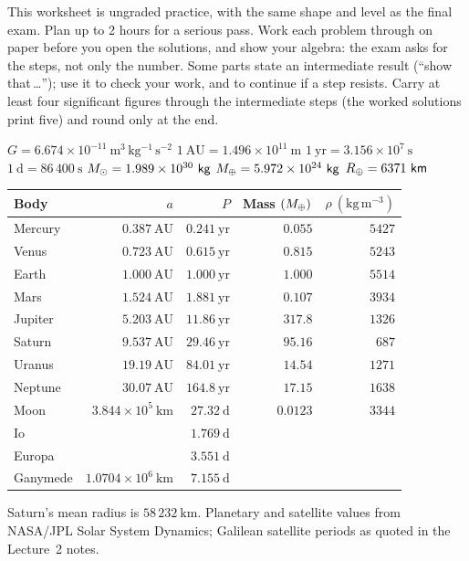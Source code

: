 
\ipsmaketitle

This worksheet is ungraded practice, with the same shape and level as the final exam.
Plan up to 2 hours for a serious pass.
Work each problem through on paper before you open the solutions, and show your algebra:
the exam asks for the steps, not only the number.
Some parts state an intermediate result (``show that\,\ldots''); use it to check your work, and to continue if a step resists.
Carry at least four significant figures through the intermediate steps (the worked solutions print five) and round only at the end.

\begin{given}
$G = 6.674 \times 10^{-11}\ \mathrm{m^3\,kg^{-1}\,s^{-2}}$ \quad
$1\ \mathrm{AU} = 1.496 \times 10^{11}\ \mathrm{m}$ \quad
$1\ \mathrm{yr} = 3.156 \times 10^{7}\ \mathrm{s}$ \quad
$1\ \mathrm{d} = 86\,400\ \mathrm{s}$ \quad
$\Msun = 1.989 \times 10^{30}\ \mathrm{kg}$ \quad
$M_{\oplus} = 5.972 \times 10^{24}\ \mathsf{kg}$ \quad
$\Rearth = 6371\ \mathrm{km}$

\vskip6pt
\begin{tabular}{@{}lrrrr@{}}
\toprule
Body & $a$ & $P$ & Mass $(M_{\oplus})$ & $\rho\ (\mathrm{kg\,m^{-3}})$ \\
\midrule
Mercury & $0.387\ \mathrm{AU}$ & $0.241\ \mathrm{yr}$ & $0.055$ & $5427$ \\
Venus   & $0.723\ \mathrm{AU}$ & $0.615\ \mathrm{yr}$ & $0.815$ & $5243$ \\
Earth   & $1.000\ \mathrm{AU}$ & $1.000\ \mathrm{yr}$ & $1.000$ & $5514$ \\
Mars    & $1.524\ \mathrm{AU}$ & $1.881\ \mathrm{yr}$ & $0.107$ & $3934$ \\
Jupiter & $5.203\ \mathrm{AU}$ & $11.86\ \mathrm{yr}$ & $317.8$ & $1326$ \\
Saturn  & $9.537\ \mathrm{AU}$ & $29.46\ \mathrm{yr}$ & $95.16$ & $687$ \\
Uranus  & $19.19\ \mathrm{AU}$ & $84.01\ \mathrm{yr}$ & $14.54$ & $1271$ \\
Neptune & $30.07\ \mathrm{AU}$ & $164.8\ \mathrm{yr}$ & $17.15$ & $1638$ \\
\midrule
Moon      & $3.844 \times 10^{5}\ \mathrm{km}$ & $27.32\ \mathrm{d}$ & $0.0123$ & $3344$ \\
Io        & & $1.769\ \mathrm{d}$ & & \\
Europa    & & $3.551\ \mathrm{d}$ & & \\
Ganymede  & $1.0704 \times 10^{6}\ \mathrm{km}$ & $7.155\ \mathrm{d}$ & & \\
\bottomrule
\end{tabular}

\vskip4pt
{\footnotesize Saturn's mean radius is $58\,232\ \mathrm{km}$. Planetary and satellite values from
NASA/JPL Solar System Dynamics; Galilean satellite periods as quoted in the Lecture~2 notes.}
\end{given}


